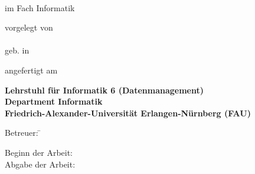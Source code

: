 \begin{titlepage}

  \begin{center}
    
    {\Huge \bfseries
      \thesistitle{}\\
    } 
    
    \vspace*{1cm}
    \thethesis{} im Fach Informatik
    \vspace{2cm}
    
    {\large vorgelegt von} \\
    \vspace*{0.7cm}
    {\Large \bfseries \myname} \\
    \vspace*{0.7cm}
    {\large geb. \birthday{} in \birthplace{}} 
    
    \vspace{1.5cm}
    
    angefertigt am 

    \vspace{1cm}
    
    {\bfseries
      Lehrstuhl für Informatik 6 (Datenmanagement) \\
      Department Informatik \\
      Friedrich-Alexander-Universität Erlangen-Nürnberg (FAU)\\
      }
    
    \vspace{0.5cm}
\end{center}
\begin{tabbing}
    Betreuer: \= \corrector{}\\
    \> \tutor{} 
\end{tabbing}
    \vspace{0.25cm}
    
\begin{tabbing}
  Beginn der Arbeit: \startofwork{} \\
  Abgabe der Arbeit: \dayofdoom{}
\end{tabbing}

\end{titlepage}

\vspace{0,5cm}
%
\cleardoubleemptypage
%
\pagestyle{plain}
%
\setcounter{page}{7}
%

%
\cleardoubleplainpage
%
\tableofcontents
%
\cleardoubleplainpage
%
\pagestyle{headings}
%
%
\setcounter{page}{1}
